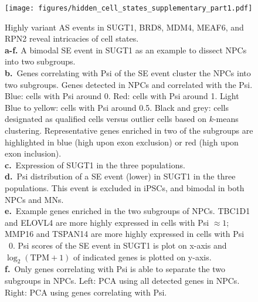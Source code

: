 \clearpage
\begin{figure}[h]
\ContinuedFloat
\captionsetup{labelformat=empty}
\centering
\texttt{[image: figures/hidden\_cell\_states\_supplementary\_part1.pdf]}
\end{figure}
\addtocounter{figure}{1}
\clearpage


\clearpage
\thispagestyle{facingcaption}
\begin{figure}[h]
\captionsetup{labelformat=prev-page}
\caption[Highly variant AS events in SUGT1, BRD8, MDM4, MEAF6, and RPN2 reveal intricacies of cell states.]{
Highly variant AS events in SUGT1, BRD8, MDM4, MEAF6, and RPN2 reveal intricacies of cell states.\\
\textbf{a-f.} A bimodal SE event in SUGT1 as an example to dissect NPCs into two subgroups.\\
\textbf{b.}~Genes correlating with Psi of the SE event cluster the NPCs into two subgroups. Genes detected in NPCs and correlated with the Psi. Blue: cells with Psi around 0. Red: cells with Psi around 1. Light Blue to yellow: cells with Psi around 0.5. Black and grey: cells designated as qualified cells versus outlier cells based on $k$-means clustering. Representative genes enriched in two of the subgroups are highlighted in blue (high upon exon exclusion) or red (high upon exon inclusion). \\
\textbf{c.}~Expression of SUGT1 in the three populations.\\
\textbf{d.}~Psi distribution of a SE event (lower) in SUGT1 in the three populations. This event is excluded in iPSCs, and bimodal in both NPCs and MNs.\\
\textbf{e.}~Example genes enriched in the two subgroups of NPCs. TBC1D1 and ELOVL4 are more highly expressed in cells with Psi $\approx 1$; MMP16 and TSPAN14 are more highly expressed in cells with Psi ~0. Psi scores of the SE event in SUGT1 is plot on x-axis and $\log_2(\mathrm{TPM}+1)$ of indicated genes is plotted on y-axis.\\
\textbf{f.}~Only genes correlating with Psi is able to separate the two subgroups in NPCs. Left: PCA using all detected genes in NPCs. Right: PCA using genes correlating with Psi.\\
}
\end{figure}
